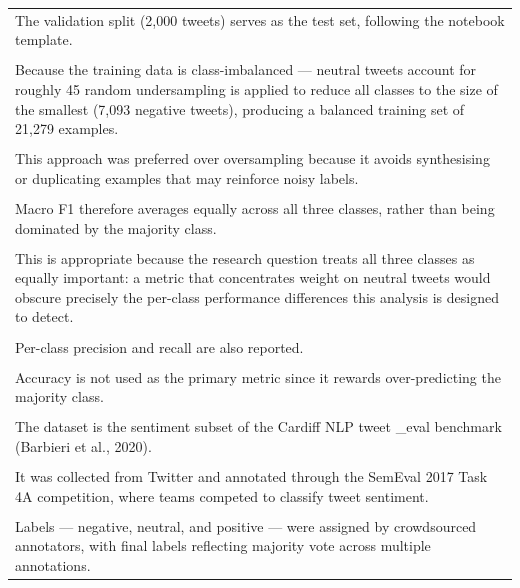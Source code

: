 \documentclass[11pt]{article}
\begin{document}
\begin{longtable}{|p{\dimexpr\linewidth-2\tabcolsep-2\arrayrulewidth\relax}|}
\hline
\rule{0pt}{3.5cm} \\
\hline
The validation split (2,000 tweets) serves as the test set, following the notebook template. \\[2pt]
\hline
\rule{0pt}{3.5cm} \\
\hline
Because the training data is class-imbalanced --- neutral tweets account for roughly 45 random undersampling is applied to reduce all classes to the size of the smallest (7,093 negative tweets), producing a balanced training set of 21,279 examples. \\[2pt]
\hline
\rule{0pt}{3.5cm} \\
\hline
This approach was preferred over oversampling because it avoids synthesising or duplicating examples that may reinforce noisy labels. \\[2pt]
\hline
\rule{0pt}{3.5cm} \\
\hline
Macro F1 therefore averages equally across all three classes, rather than being dominated by the majority class. \\[2pt]
\hline
\rule{0pt}{3.5cm} \\
\hline
This is appropriate because the research question treats all three classes as equally important: a metric that concentrates weight on neutral tweets would obscure precisely the per-class performance differences this analysis is designed to detect. \\[2pt]
\hline
\rule{0pt}{3.5cm} \\
\hline
Per-class precision and recall are also reported. \\[2pt]
\hline
\rule{0pt}{3.5cm} \\
\hline
Accuracy is not used as the primary metric since it rewards over-predicting the majority class. \\[2pt]
\hline
\rule{0pt}{3.5cm} \\
\hline
The dataset is the sentiment subset of the Cardiff NLP tweet \_eval benchmark (Barbieri et al., 2020). \\[2pt]
\hline
\rule{0pt}{3.5cm} \\
\hline
It was collected from Twitter and annotated through the SemEval 2017 Task 4A competition, where teams competed to classify tweet sentiment. \\[2pt]
\hline
\rule{0pt}{3.5cm} \\
\hline
Labels --- negative, neutral, and positive --- were assigned by crowdsourced annotators, with final labels reflecting majority vote across multiple annotations. \\[2pt]

\end{longtable}
\end{document}
